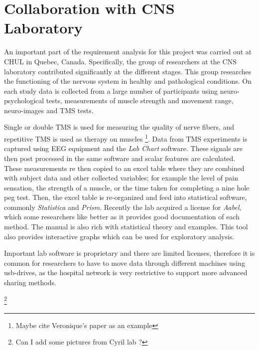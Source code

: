
\section{Collaboration with CNS Laboratory}

An important part of the requirement analysis for this project was carried out at CHUL in Quebec, Canada. Specifically, the group of researchers at the CNS laboratory contributed significantly at the different stages. This group researches the functioning of the nervous system in healthy and pathological conditions. On each study data is collected from a large number of participants using neuro-psychological tests, measurements of muscle strength and movement range, neuro-images and TMS tests. 

Single or double TMS is used for measuring the quality of nerve fibers, and repetitive TMS is used as therapy on muscles \footnote{Maybe cite Veronique's paper as an example}. Data from TMS experiments is captured using EEG equipment and the \emph{Lab Chart} software. These signals are then post processed in the same software and scalar features are calculated. These measurements re then copied to an excel table where they are combined with subject data and other collected variables; for example the level of pain sensation, the strength of a muscle, or the time taken for completing a nine hole peg test. Then, the excel table is re-organized and feed into statistical software, commonly \emph{Statistica} and \emph{Prism}. Recently the lab acquired a license for \emph{Aabel}, which some researchers like better as it provides good documentation of each method. The manual is also rich with statistical theory and examples. This tool also provides interactive graphs which can be used for exploratory analysis. 

Important lab software is proprietary and there are limited licenses, therefore it is common for researchers to have to move data through different machines using usb-drives, as the hospital network is very restrictive to support more advanced sharing methods.


\footnote{Can I add some pictures from Cyril lab ?}

 
